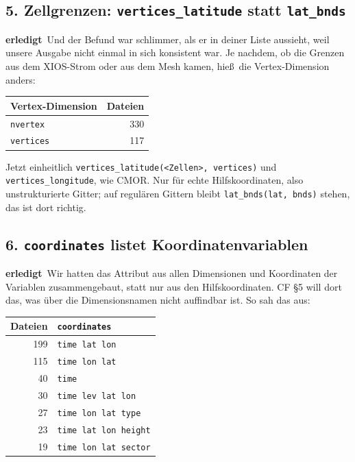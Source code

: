\documentclass[11pt,a4paper]{article}
\newcommand{\code}[1]{\texttt{\small #1}}
\newcommand{\ok}{\textcolor{green!45!black}{\textbf{erledigt}}}
\begin{document}
\subsection*{5. Zellgrenzen: \code{vertices\_latitude} statt \code{lat\_bnds}}
\ok\ Und der Befund war schlimmer, als er in deiner Liste aussieht, weil unsere
Ausgabe nicht einmal in sich konsistent war. Je nachdem, ob die Grenzen aus dem
XIOS-Strom oder aus dem Mesh kamen, hie\ss\ die Vertex-Dimension anders:

\begin{center}
\begin{tabular}{lr}
\toprule
\textbf{Vertex-Dimension} & \textbf{Dateien} \\
\midrule
\code{nvertex}  & 330 \\
\code{vertices} & 117 \\
\bottomrule
\end{tabular}
\end{center}

Jetzt einheitlich \code{vertices\_latitude(<Zellen>, vertices)} und
\code{vertices\_longitude}, wie CMOR. Nur f\"ur echte Hilfskoordinaten, also
unstrukturierte Gitter; auf regul\"aren Gittern bleibt \code{lat\_bnds(lat, bnds)}
stehen, das ist dort richtig.

\subsection*{6. \code{coordinates} listet Koordinatenvariablen}
\ok\ Wir hatten das Attribut aus allen Dimensionen und Koordinaten der Variablen
zusammengebaut, statt nur aus den Hilfskoordinaten. CF \S5 will dort das, was
\"uber die Dimensionsnamen nicht auffindbar ist. So sah das aus:

\begin{center}
\begin{tabular}{rl}
\toprule
\textbf{Dateien} & \textbf{\code{coordinates}} \\
\midrule
199 & \code{time lat lon} \\
115 & \code{time lon lat} \\
 40 & \code{time} \\
 30 & \code{time lev lat lon} \\
 27 & \code{time lon lat type} \\
 23 & \code{time lat lon height} \\
 19 & \code{time lon lat sector} \\
\bottomrule
\end{tabular}
\end{center}
\end{document}
